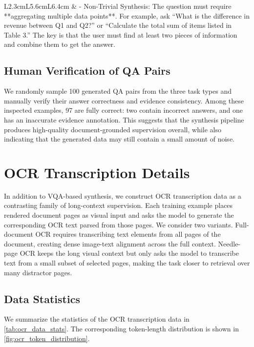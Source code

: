 {{\begin{table}[H]
\begin{tabular}{L{2.3cm}L{5.6cm}L{6.4cm}}
 & - Non-Trivial Synthesis: The question must require **aggregating multiple data points**. For example, ask ``What is the difference in revenue between Q1 and Q2?'' or ``Calculate the total sum of items listed in Table 3.'' The key is that the user must find at least two pieces of information and combine them to get the answer. \\
 \bottomrule
 \end{tabular}
\end{table}

\subsection{Human Verification of QA Pairs}
\label{app:long_document_vqa_details:verification}
We randomly sample 100 generated QA pairs from the three task types and manually verify their answer correctness and evidence consistency.
Among these inspected examples, 97 are fully correct: two contain incorrect answers, and one has an inaccurate evidence annotation.
This suggests that the synthesis pipeline produces high-quality document-grounded supervision overall, while also indicating that the generated data may still contain a small amount of noise.

\section{OCR Transcription Details}
\label{app:ocr_transcription_details}
In addition to VQA-based synthesis, we construct OCR transcription data as a contrasting family of long-context supervision.
Each training example places rendered document pages as visual input and asks the model to generate the corresponding OCR text parsed from those pages.
We consider two variants.
Full-document OCR requires transcribing text elements from all pages of the document, creating dense image-text alignment across the full context.
Needle-page OCR keeps the long visual context but only asks the model to transcribe text from a small subset of selected pages, making the task closer to retrieval over many distractor pages.

\subsection{Data Statistics}
\label{app:ocr_transcription_details:data_stats}
We summarize the statistics of the OCR transcription data in \cref{tab:ocr_data_stats}.
The corresponding token-length distribution is shown in \cref{fig:ocr_token_distribution}.

}}
